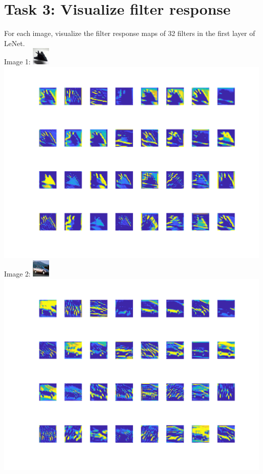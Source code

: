 \documentclass[10pt]{article}
\begin{document}
\section*{\small{Task 3: Visualize filter response}}
For each image, visualize the filter response maps of 32 filters in the first layer of LeNet. \\
Image 1:
\includegraphics{1}\\
\includegraphics[scale=0.65]{1_filter_res}\\
\newpage
Image 2:
\includegraphics{2}\\
\includegraphics[scale=0.65]{2_filter_res}\\
\end{document}
